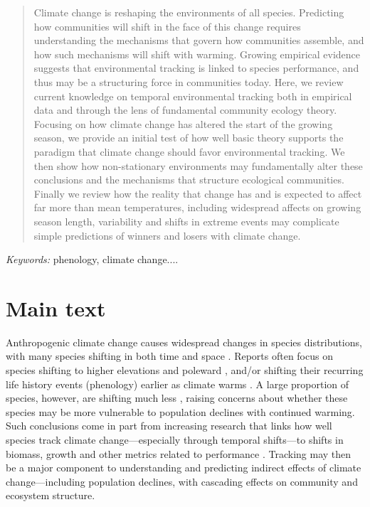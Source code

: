 \documentclass[11pt,letterpaper]{article}
\begin{document}
\begin{abstract} 
Climate change is reshaping the environments of all species. Predicting how communities will shift in the face of this change requires understanding the mechanisms that govern how communities assemble, and how such mechanisms will shift with warming. Growing empirical evidence suggests that environmental tracking is linked to species performance, and thus may be a structuring force in communities today. Here, we review current knowledge on temporal environmental tracking both in empirical data and through the lens of fundamental community ecology theory. Focusing on how climate change has altered the start of the growing season, we provide an initial test of how well basic theory supports the paradigm that climate change should favor environmental tracking. We then show how non-stationary environments may fundamentally alter these conclusions and the mechanisms that structure ecological communities. Finally we review how the reality that change has and is expected to affect far more than mean temperatures, including widespread affects on growing season length, variability and shifts in extreme events may complicate simple predictions of winners and losers with climate change. 
\end{abstract}
\noindent \emph{Keywords:} phenology, climate change....\\



\section{Main text}
Anthropogenic climate change causes widespread changes in species distributions, with many species shifting in both time and space \citep{IPCC:2014sm}. Reports often focus on species shifting to higher elevations and poleward \citep{Chen2011}, and/or shifting their recurring life history events (phenology) earlier as climate warms \citep{Menzel:2006sq,Wolkovich:2012n,cohen2018}. A large proportion of species, however, are shifting much less \citep{Cook:2012pnas}, raising concerns about whether these species may be more vulnerable to population declines with continued warming. Such conclusions come in part from increasing research that links how well species track climate change---especially through temporal shifts---to shifts in biomass, growth and other metrics related to performance \citep{Cleland:2012}. Tracking may then be a major component to understanding and predicting indirect effects of climate change---including population declines, with cascading effects on community and ecosystem structure.
\end{document}
